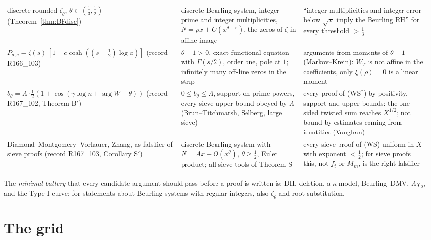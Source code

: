 \documentclass[11pt]{amsart}
\theoremstyle{definition}
\theoremstyle{remark}
\begin{document}
\begin{table}[ht]
\begin{tabularx}{\textwidth}{@{}p{3.3cm}p{4.0cm}Y@{}}
discrete rounded $\zeta_\theta$, $\theta\in(\frac13,\frac12)$ (Theorem~\ref{thm:BFdisc}) & discrete Beurling system, integer prime and integer multiplicities, $N=\rho x+O(x^{\theta+\varepsilon})$, the zeros of $\zeta$ in affine image & ``integer multiplicities and integer error below $\sqrt x$ imply the Beurling RH'' for every threshold $>\frac13$ \\
$P_{a,c}=\zeta(s)\,[1+c\cosh((s-\frac12)\log a)]$ (record R166\_103) & $\theta-1>0$, exact functional equation with $\Gamma(s/2)$, order one, pole at $1$; infinitely many off-line zeros in the strip & arguments from moments of $\theta-1$ (Markov--Krein): $W_T$ is not affine in the coefficients, only $\xi(\rho)=0$ is a linear moment \\
$b_\theta=\Lambda\cdot\frac12(1+\cos(\gamma\log n+\arg W+\theta))$ (record R167\_102, Theorem B$'$) & $0\le b_\theta\le\Lambda$, support on prime powers, every sieve upper bound obeyed by $\Lambda$ (Brun--Titchmarsh, Selberg, large sieve) & every proof of (WS$^*$) by positivity, support and upper bounds: the one-sided twisted sum reaches $X^{1/2}$; not bound by estimates coming from identities (Vaughan) \\
Diamond--Montgomery--Vorhauer, Zhang, as falsifier of sieve proofs (record R167\_103, Corollary S$'$) & discrete Beurling system with $N=Ax+O(x^\theta)$, $\theta\ge\frac12$, Euler product; all sieve tools of Theorem S & every sieve proof of (WS) uniform in $X$ with exponent $<\frac12$; for sieve proofs this, not $f_t$ or $M_m$, is the right falsifier \\
\bottomrule
\end{tabularx}
\end{table}

The \emph{minimal battery} that every candidate argument should pass before a proof is written is: DH,
deletion, a $\kappa$-model, Beurling--DMV, $\Lambda\chi_2$, and the Type I curve; for statements about Beurling systems with regular integers, also $\zeta_\theta$ and root substitution.

\section{The grid}\label{sec:grid}
\end{document}
